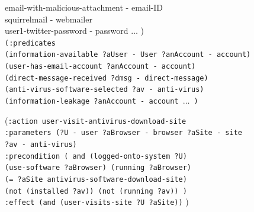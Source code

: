 \begin{figure}[pbt]
{{{{\hspace*{35pt}email-with-malicious-attachment - email-ID\\
\hspace*{35pt}squirrelmail - webmailer\\
\hspace*{35pt}user1-twitter-password - password $\ldots$ )\\[15 pt]
}
\hspace*{35pt}\texttt{(:predicates \\
\hspace*{35pt}(information-available ?aUser - User ?anAccount - account) \\
\hspace*{35pt}(user-has-email-account ?anAccount - account)\\
\hspace*{35pt}(direct-message-received ?dmsg - direct-message)\\
\hspace*{35pt}(anti-virus-software-selected ?av - anti-virus) \\
\hspace*{35pt}(information-leakage ?anAccount - account $\ldots$ )\\[15pt]
}

\hspace*{35pt}(\texttt{:action user-visit-antivirus-download-site}\\
\hspace*{35pt}\texttt{:parameters (?U - user ?aBrowser - browser ?aSite - site \\\hspace*{35pt} ?av - anti-virus)}\\
\hspace*{35pt}\texttt{:precondition ( and (logged-onto-system ?U) \\\hspace*{35pt} (use-software ?aBrowser) (running ?aBrowser) \\\hspace*{35pt} (= ?aSite antivirus-software-download-site) \\\hspace*{35pt} (not (installed ?av))  (not (running ?av)) )}\\
\hspace*{35pt}\texttt{:effect (and (user-visits-site ?U ?aSite))}
)\\[15pt]

}}}
\end{figure}
